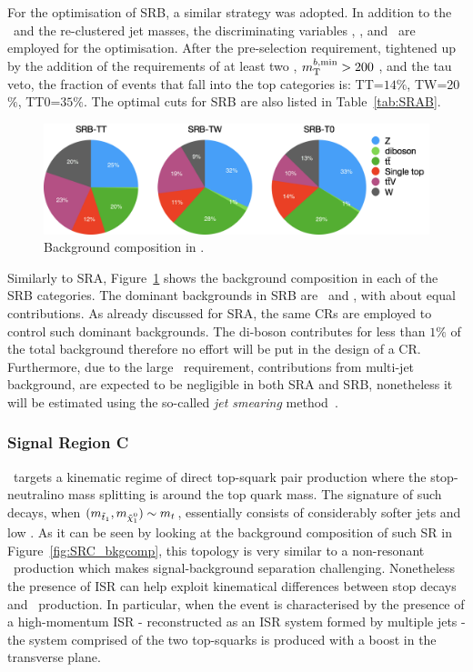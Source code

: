 				For the optimisation of SRB, a similar strategy was adopted. In addition to the \met\ and the re-clustered jet masses, the discriminating variables \mtbmin, \mtbmax, and \drbb\ are employed for the optimisation. After the pre-selection requirement, tightened up by the addition of the requirements of at least two \bjs, $m_{\mathrm{T}}^{b,\mathrm{min}} > 200$ \gev, and the tau veto, the fraction of events that fall into the top categories is: TT=$14\%$, TW=20$\%$, TT0=$35\%$. The optimal cuts for SRB are also listed in Table~\ref{tab:SRAB}. 

				\begin{figure}[t]
				  \begin{center}
				   \includegraphics[width=\textwidth]{figures/stop/piechart_SRBcomp}
				   \caption{Background composition in \SRB.}
				   \label{fig:SRB_bkgcomp}
				  \end{center}
				\end{figure}

				Similarly to SRA, Figure~\ref{fig:SRB_bkgcomp} shows the background composition in each of the SRB categories. The dominant backgrounds in SRB are \Zjets\ and \ttbar, with about equal contributions. As already discussed for SRA, the same \acp{CR} are employed to control such dominant backgrounds. The di-boson contributes for less than $1\%$ of the total background therefore no effort will be put in the design of a \ac{CR}. Furthermore, due to the large \met\ requirement, contributions from multi-jet background, are expected to be negligible in both SRA and SRB, nonetheless it will be estimated using the so-called \emph{jet smearing} method~\cite{calumThesis}.




			\subsubsection*{Signal Region C}

				\SRC\ targets a kinematic regime of direct top-squark pair production where the stop-neutralino mass splitting is around the top quark mass. The signature of such decays, when $(\mstopone, \mninoone) \sim m_t$, essentially consists of considerably softer jets and low \met. As it can be seen by looking at the background composition of such \ac{SR} in Figure~\ref{fig:SRC_bkgcomp}, this topology is very similar to a non-resonant \ttbar\ production which makes signal-background separation challenging. Nonetheless the presence of \ac{ISR} can help exploit kinematical differences between stop decays and \ttbar\ production. In particular, when the event is characterised by the presence of a high-momentum \ac{ISR} - reconstructed as an \ac{ISR} system formed by multiple jets - the system comprised of the two top-squarks is produced with a boost in the transverse plane.

